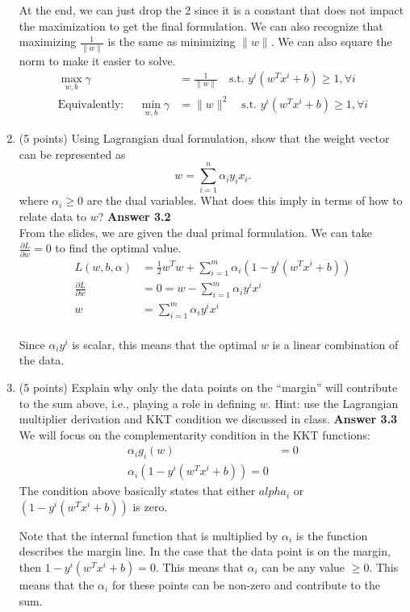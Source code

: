 \documentclass[twoside,10pt]{article}
\begin{document}
\begin{enumerate}
At the end, we can just drop the 2 since it is a constant that does not impact the maximization to get the final formulation. We can also recognize that maximizing $\frac{1}{\|w\|}$ is the same as minimizing $\|w\|$. We can also square the norm to make it easier to solve.
\begin{align*}
    \max_{w,b} \gamma &= \frac{1}{\|w\|} \quad \text{s.t. } y^i(w^Tx^i + b) \geq 1, \forall i \\
    \text{Equivalently: } \quad \min_{w,b} \gamma &= \|w\|^2 \quad \text{s.t. } y^i(w^Tx^i + b) \geq 1, \forall i
\end{align*}

\item (5 points) Using Lagrangian dual formulation, show that the weight vector can be represented as
\[
w = \sum_{i=1}^n \alpha_i y_i x_i.
\]
where $\alpha_i \geq 0$ are the dual variables. What does this imply in terms of how to relate data to $w$?
{\bf Answer 3.2}\\
From the slides, we are given the dual primal formulation. We can take $\frac{\partial L}{\partial w}=0$ to find the optimal value.
\begin{align*}
    L(w,b,\alpha) &= \frac{1}{2} w^Tw + \sum_{i=1}^m \alpha_i(1-y^i(w^Tx^i + b)) \\
    \frac{\partial L}{\partial w} &= 0 = w - \sum_{i=1}^m \alpha_i y^ix^i \\
    w &= \sum_{i=1}^m \alpha_i y^ix^i \\
\end{align*}

Since $\alpha_iy^i$ is scalar, this means that the optimal $w$ is a linear combination of the data. 

\item (5 points) Explain why only the data points on the ``margin'' will contribute to the sum above, i.e., playing a role in defining $w$. Hint: use the Lagrangian multiplier derivation and KKT condition we discussed in class. 
{\bf Answer 3.3}\\
We will focus on the complementarity condition in the KKT functions:
\begin{align*}
    \alpha_i g_i(w) &= 0 \\
    \alpha_i(1-y^i(w^Tx^i + b)) = 0
\end{align*}
The condition above basically states that either $alpha_i$ or $(1-y^i(w^Tx^i + b))$ is zero.

Note that the internal function that is multiplied by $\alpha_i$ is the function describes the margin line. In the case that the data point is on the margin, then $1-y^i(w^Tx^i + b) = 0$. This means that $\alpha_i$ can be any value $\geq 0$. This means that the $\alpha_i$ for these points can be non-zero and contribute to the sum.


\end{enumerate}
\end{document}
